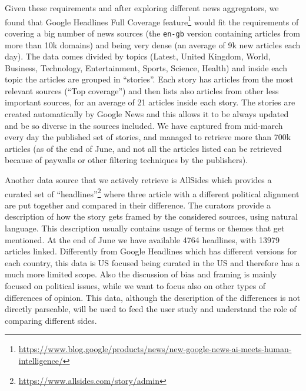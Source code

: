 Given these requirements and after exploring different news aggregators, we found that Google Headlines Full Coverage feature\footnote{\url{https://www.blog.google/products/news/new-google-news-ai-meets-human-intelligence/}} would fit the requirements of covering a big number of news sources (the \texttt{en-gb} version containing articles from more than 10k domains) and being very dense (an average of 9k new articles each day).
The data comes divided by topics (Latest, United Kingdom, World, Business, Technology, Entertainment, Sports, Science, Health) and inside each topic the articles are grouped in ``stories''. Each story has articles from the most relevant sources (``Top coverage'') and then lists also articles from other less important sources, for an average of 21 articles inside each story.
The stories are created automatically by Google News and this allows it to be always updated and be so diverse in the sources included.
We have captured from mid-march every day the published set of stories, and managed to retrieve more than 700k articles (as of the end of June, and not all the articles listed can be retrieved because of paywalls or other filtering techniques by the publishers).

Another data source that we actively retrieve is AllSides which provides a curated set of ``headlines''\footnote{\url{https://www.allsides.com/story/admin}} where three article with a different political alignment are put together and compared in their difference.
The curators provide a description of how the story gets framed by the considered sources, using natural language.
This description usually contains usage of terms or themes that get mentioned.
At the end of June we have available 4764 headlines, with 13979 articles linked.
Differently from Google Headlines which has different versions for each country, this data is US focused being curated in the US and therefore has a much more limited scope. Also the discussion of bias and framing is mainly focused on political issues, while we want to focus also on other types of differences of opinion.
This data, although the description of the differences is not directly parseable, will be used to feed the user study and understand the role of comparing different sides.


